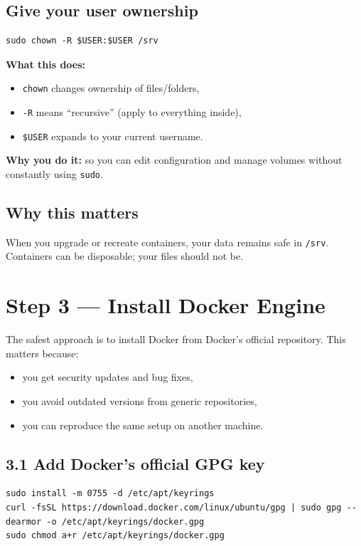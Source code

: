 \subsection*{Give your user ownership}
\begin{lstlisting}
sudo chown -R $USER:$USER /srv
\end{lstlisting}

\textbf{What this does:}
\begin{itemize}[leftmargin=*]
  \item \texttt{chown} changes ownership of files/folders,
  \item \texttt{-R} means ``recursive'' (apply to everything inside),
  \item \texttt{\$USER} expands to your current username.
\end{itemize}

\textbf{Why you do it:} so you can edit configuration and manage volumes without constantly using \texttt{sudo}.

\subsection{Why this matters}
When you upgrade or recreate containers, your data remains safe in \texttt{/srv}.
Containers can be disposable; your files should not be.

\section{Step 3 --- Install Docker Engine}
The safest approach is to install Docker from Docker's official repository.
This matters because:
\begin{itemize}[leftmargin=*]
  \item you get security updates and bug fixes,
  \item you avoid outdated versions from generic repositories,
  \item you can reproduce the same setup on another machine.
\end{itemize}

\subsection{3.1 Add Docker's official GPG key}
\begin{lstlisting}
sudo install -m 0755 -d /etc/apt/keyrings
curl -fsSL https://download.docker.com/linux/ubuntu/gpg | sudo gpg --dearmor -o /etc/apt/keyrings/docker.gpg
sudo chmod a+r /etc/apt/keyrings/docker.gpg
\end{lstlisting}

